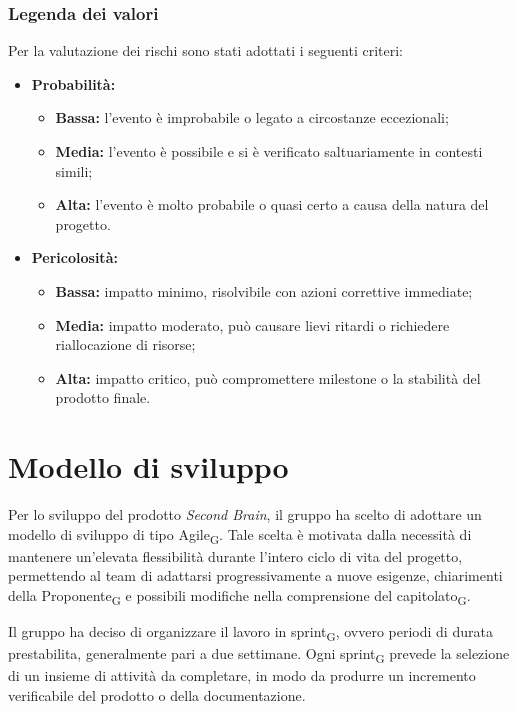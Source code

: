 \documentclass[a4paper, 10pt, colorlinks=true, linkcolor=black, urlcolor=blue, citecolor=blue, hidelinks]{article}
\begin{document}
\subsubsection{Legenda dei valori}
Per la valutazione dei rischi sono stati adottati i seguenti criteri:

\begin{itemize}
    \item \textbf{Probabilità:}
    \begin{itemize}
        \item \textbf{Bassa:} l'evento è improbabile o legato a circostanze eccezionali;
        \item \textbf{Media:} l'evento è possibile e si è verificato saltuariamente in contesti simili;
        \item \textbf{Alta:} l'evento è molto probabile o quasi certo a causa della natura del progetto.
    \end{itemize}
    \item \textbf{Pericolosità:}
    \begin{itemize}
        \item \textbf{Bassa:} impatto minimo, risolvibile con azioni correttive immediate;
        \item \textbf{Media:} impatto moderato, può causare lievi ritardi o richiedere riallocazione di risorse;
        \item \textbf{Alta:} impatto critico, può compromettere milestone o la stabilità del prodotto finale.
    \end{itemize}
\end{itemize}

\section{Modello di sviluppo}

Per lo sviluppo del prodotto \textit{Second Brain}, il gruppo ha scelto di adottare un modello di sviluppo di tipo Agile\textsubscript{G}. Tale scelta è motivata dalla necessità di mantenere un'elevata flessibilità durante l'intero ciclo di vita del progetto, permettendo al team di adattarsi progressivamente a nuove esigenze, chiarimenti della Proponente\textsubscript{G} e possibili modifiche nella comprensione del capitolato\textsubscript{G}.

Il gruppo ha deciso di organizzare il lavoro in sprint\textsubscript{G}, ovvero periodi di durata prestabilita, generalmente pari a due settimane. Ogni sprint\textsubscript{G} prevede la selezione di un insieme di attività da completare, in modo da produrre un incremento verificabile del prodotto o della documentazione.
\end{document}
